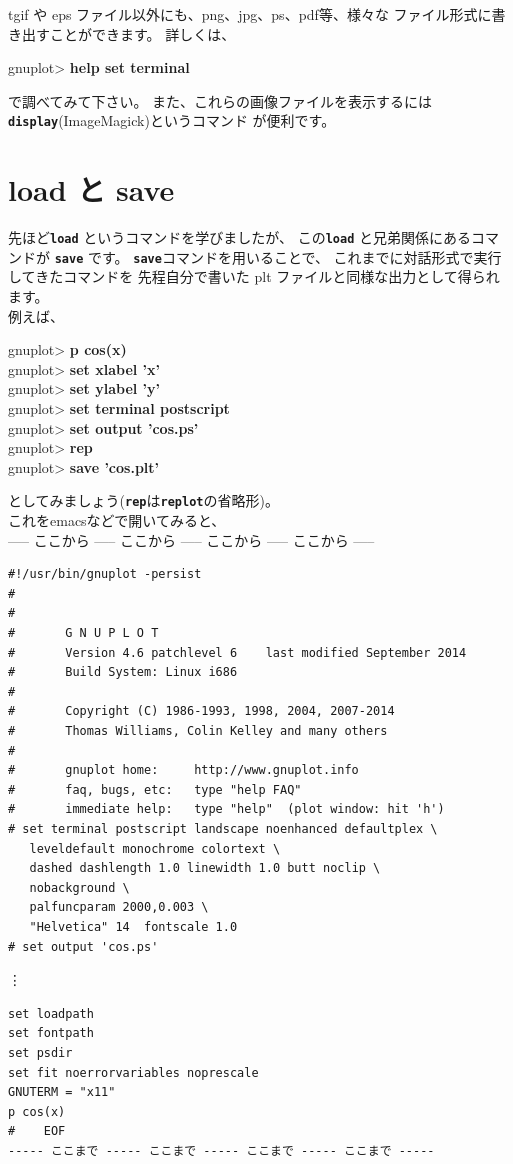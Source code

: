\documentclass[a4j]{ujarticle} %
\newenvironment{terminal}{%
  \begin{center}
   \begin{minipage}{.8\textwidth}
    \setlength{\FrameSep}{.5\FrameSep}%
    \begin{framed}\ttfamily\small%
     \setlength\baselineskip{.85\baselineskip}%
}{%
    \end{framed}
   \end{minipage}
  \end{center}%
}
\begin{document}
tgif や eps ファイル以外にも、png、jpg、ps、pdf等、様々な
ファイル形式に書き出すことができます。
詳しくは、
\begin{terminal}
 gnuplot> {\bf help set terminal}
\end{terminal}
で調べてみて下さい。
また、これらの画像ファイルを表示するには{\tt\bf display}(ImageMagick)というコマンド
が便利です。

\section{load と save}
先ほど{\tt\bf load} というコマンドを学びましたが、
この{\tt\bf load} と兄弟関係にあるコマンドが {\tt\bf save} です。
{\tt\bf save}コマンドを用いることで、
これまでに対話形式で実行してきたコマンドを
先程自分で書いた plt ファイルと同様な出力として得られます。\\
例えば、
\begin{terminal}
 gnuplot> {\bf p cos(x)} \\
 gnuplot> {\bf set xlabel 'x'} \\
 gnuplot> {\bf set ylabel 'y'}\\
 gnuplot> {\bf set terminal postscript}\\
 gnuplot> {\bf set output 'cos.ps'}\\
 gnuplot> {\bf rep}\\
 gnuplot> {\bf save 'cos.plt'}
\end{terminal}
としてみましょう({\tt\bf rep}は{\tt\bf replot}の省略形)。\\
これをemacsなどで開いてみると、\\
----- ここから ----- ここから ----- ここから ----- ここから -----
\begin{verbatim}
#!/usr/bin/gnuplot -persist
#
#    
#    	G N U P L O T
#    	Version 4.6 patchlevel 6    last modified September 2014
#    	Build System: Linux i686
#    
#    	Copyright (C) 1986-1993, 1998, 2004, 2007-2014
#    	Thomas Williams, Colin Kelley and many others
#    
#    	gnuplot home:     http://www.gnuplot.info
#    	faq, bugs, etc:   type "help FAQ"
#    	immediate help:   type "help"  (plot window: hit 'h')
# set terminal postscript landscape noenhanced defaultplex \
   leveldefault monochrome colortext \
   dashed dashlength 1.0 linewidth 1.0 butt noclip \
   nobackground \
   palfuncparam 2000,0.003 \
   "Helvetica" 14  fontscale 1.0 
# set output 'cos.ps'
\end{verbatim}
\hspace{2cm} \vdots
\begin{verbatim}
set loadpath 
set fontpath 
set psdir
set fit noerrorvariables noprescale
GNUTERM = "x11"
p cos(x)
#    EOF
----- ここまで ----- ここまで ----- ここまで ----- ここまで -----
\end{verbatim}
\end{document}
